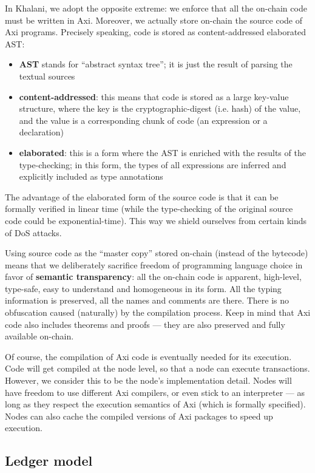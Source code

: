 \documentclass[a4paper]{article}
\begin{document}
In Khalani, we adopt the opposite extreme: we enforce that all the on-chain code must be written in Axi. Moreover, we actually store on-chain the source code of Axi programs. Precisely speaking, code is stored as content-addressed elaborated AST:

\begin{itemize}
  \item \textbf{AST} stands for ``abstract syntax tree''; it is just the result of parsing the textual sources
  \item \textbf{content-addressed}: this means that code is stored as a large key-value structure, where the key is the cryptographic-digest (i.e. hash) of the value, and the value is a corresponding chunk of code (an expression or a declaration)
  \item \textbf{elaborated}: this is a form where the AST is enriched with the results of the type-checking; in this form, the types of all expressions are inferred and explicitly included as type annotations
\end{itemize}

The advantage of the elaborated form of the source code is that it can be formally verified in linear time (while the type-checking of the original source code could be exponential-time). This way we shield ourselves from certain kinds of DoS attacks.

Using source code as the ``master copy'' stored on-chain (instead of the bytecode) means that we deliberately sacrifice freedom of programming language choice in favor of \textbf{semantic transparency}: all the on-chain code is apparent, high-level, type-safe, easy to understand and homogeneous in its form. All the typing information is preserved, all the names and comments are there. There is no obfuscation caused (naturally) by the compilation process. Keep in mind that Axi code also includes theorems and proofs --- they are also preserved and fully available on-chain.

Of course, the compilation of Axi code is eventually needed for its execution. Code will get compiled at the node level, so that a node can execute transactions. However, we consider this to be the node's implementation detail. Nodes will have freedom to use different Axi compilers, or even stick to an interpreter --- as long as they respect the execution semantics of Axi (which is formally specified). Nodes can also cache the compiled versions of Axi packages to speed up execution.

\subsection{Ledger model}
\end{document}

